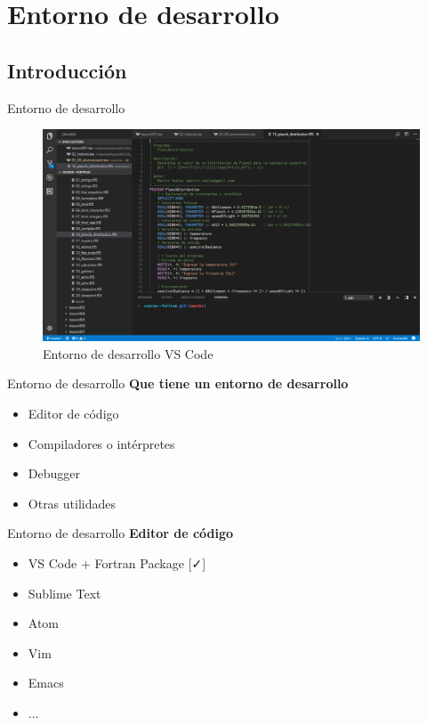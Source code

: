 \section{Entorno de desarrollo}


\subsection{Introducción}
\begin{frame}[fragile]{Entorno de desarrollo}
  \begin{figure}
      \includegraphics[width=1\textwidth]{./resources/IDE-VSCODE.png}
      \caption{Entorno de desarrollo VS Code}
  \end{figure}
\end{frame}

\begin{frame}[fragile]{Entorno de desarrollo}
  \textbf{Que tiene un entorno de desarrollo}
  \begin{itemize}[<+(1)->]
    \item Editor de código
    \item Compiladores o intérpretes
    \item Debugger
    \item Otras utilidades
  \end{itemize}
\end{frame}


\begin{frame}[fragile]{Entorno de desarrollo}
  \textbf{Editor de código}
  \begin{itemize}[<+(1)->]
    \item VS Code + Fortran Package [{\color{green-600}\faCheck}]
    \item Sublime Text
    \item Atom
    \item Vim
    \item Emacs
    \item ...
  \end{itemize}
\end{frame}


